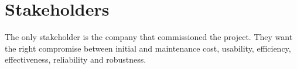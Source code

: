 \section{Stakeholders}
The only stakeholder is the company that commissioned the project. They want the right compromise between initial and maintenance cost, usability, efficiency, effectiveness, reliability and robustness.
